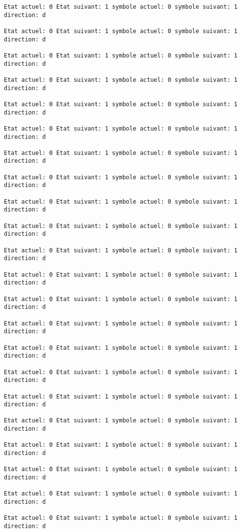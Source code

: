 \documentclass{article}
\begin{document}
\begin{verbatim}
Etat actuel: 0 Etat suivant: 1 symbole actuel: 0 symbole suivant: 1 direction: d

Etat actuel: 0 Etat suivant: 1 symbole actuel: 0 symbole suivant: 1 direction: d

Etat actuel: 0 Etat suivant: 1 symbole actuel: 0 symbole suivant: 1 direction: d

Etat actuel: 0 Etat suivant: 1 symbole actuel: 0 symbole suivant: 1 direction: d

Etat actuel: 0 Etat suivant: 1 symbole actuel: 0 symbole suivant: 1 direction: d

Etat actuel: 0 Etat suivant: 1 symbole actuel: 0 symbole suivant: 1 direction: d

Etat actuel: 0 Etat suivant: 1 symbole actuel: 0 symbole suivant: 1 direction: d

Etat actuel: 0 Etat suivant: 1 symbole actuel: 0 symbole suivant: 1 direction: d

Etat actuel: 0 Etat suivant: 1 symbole actuel: 0 symbole suivant: 1 direction: d

Etat actuel: 0 Etat suivant: 1 symbole actuel: 0 symbole suivant: 1 direction: d

Etat actuel: 0 Etat suivant: 1 symbole actuel: 0 symbole suivant: 1 direction: d

Etat actuel: 0 Etat suivant: 1 symbole actuel: 0 symbole suivant: 1 direction: d

Etat actuel: 0 Etat suivant: 1 symbole actuel: 0 symbole suivant: 1 direction: d

Etat actuel: 0 Etat suivant: 1 symbole actuel: 0 symbole suivant: 1 direction: d

Etat actuel: 0 Etat suivant: 1 symbole actuel: 0 symbole suivant: 1 direction: d

Etat actuel: 0 Etat suivant: 1 symbole actuel: 0 symbole suivant: 1 direction: d

Etat actuel: 0 Etat suivant: 1 symbole actuel: 0 symbole suivant: 1 direction: d

Etat actuel: 0 Etat suivant: 1 symbole actuel: 0 symbole suivant: 1 direction: d

Etat actuel: 0 Etat suivant: 1 symbole actuel: 0 symbole suivant: 1 direction: d

Etat actuel: 0 Etat suivant: 1 symbole actuel: 0 symbole suivant: 1 direction: d

Etat actuel: 0 Etat suivant: 1 symbole actuel: 0 symbole suivant: 1 direction: d

Etat actuel: 0 Etat suivant: 1 symbole actuel: 0 symbole suivant: 1 direction: d


\end{verbatim}
\end{document}
